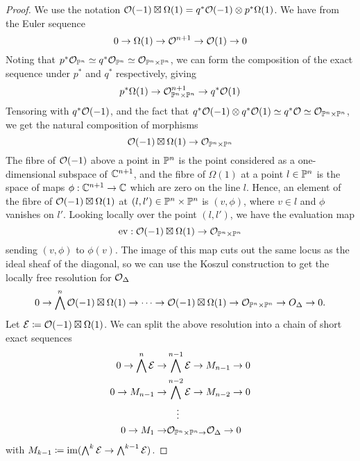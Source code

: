 \begin{proof}
    We use the notation $\O(-1)\boxtimes\Omega(1)=q^*\O(-1)\otimes p^*\Omega(1)$. We have from \cite{Hartshorne} the Euler sequence
    \begin{equation*}
        0 \to \Omega(1) \to \O^{n+1} \to \O(1) \to 0
    \end{equation*}
    Noting that $p^*\O_{\P^n}\simeq q^*\O_{\P^n}\simeq\O_{\P^n\times\P^n}$, we can form the composition of the exact sequence under $p^*$ and $q^*$ respectively, giving
    \begin{equation*}
        p^*\Omega(1) \to \O_{\P^n\times\P^n}^{n+1}\to q^*\O(1)
    \end{equation*}
    Tensoring with $q^*\O(-1)$, and the fact that $q^*\O(-1)\otimes q^*\O(1)\simeq q^*\O\simeq\O_{\P^n\times\P^n}$, we get the natural composition of morphisms
    \begin{equation*}
        \O(-1)\boxtimes\Omega(1) \to \O_{\P^n\times\P^n}
    \end{equation*}
    The fibre of $\O(-1)$ above a point in $\P^n$ is the point considered as a one-dimensional subspace of $\C^{n+1}$, and the fibre of $\Omega(1)$ at a point $l \in \P^n$ is the space of maps $\phi : \C^{n+1}\to \C$ which are zero on the line $l$. Hence, an element of the fibre of  $\O(-1)\boxtimes \Omega (1)$ at $(l,l') \in \P^{n}\times \P^n$ is $(v,\phi)$, where $v \in l$ and $\phi$ vanishes on $l'$. Looking locally over the point $(l,l')$, we have the evaluation map
    \begin{equation*}
        \ev : \O(-1)\boxtimes \Omega (1) \to \O_{\P^{n}\times \P^{n}}
    \end{equation*}
    sending $(v,\phi)$ to $\phi(v)$. The image of this map cuts out the same locus as the ideal sheaf of the diagonal, so we can use the Koszul construction to get the locally free resolution for $\O_\Delta$
    \begin{equation*}
        0 \to \bigwedge^{n}\O(-1)\boxtimes\Omega(1) \to \dots\to \O(-1)\boxtimes\Omega(1)\to \O_{\P^{n}\times \P^{n}} \to O_{\Delta}\to 0.
    \end{equation*}
    Let $\calE\coloneqq\O(-1)\boxtimes\Omega(1)$.
    We can split the above resolution into a chain of short exact sequences
    \begin{align*}
        0 \to \bigwedge^{n}\calE \to &\bigwedge^{n-1}\calE\to M_{n-1}\to 0  \\
        0\to M_{n-1}\to & \bigwedge^{n-2}\calE\to M_{n-2}\to 0  \\
        &\quad\vdots \\
        0\to M_{1}\to &\O_{\P^{n}\times \P^{n}\to}\O_{\Delta}\to 0
    \end{align*}
    with $M_{k-1}\coloneqq\im(\bigwedge^{k}\calE \to \bigwedge^{k-1}\calE)$.


\end{proof}
